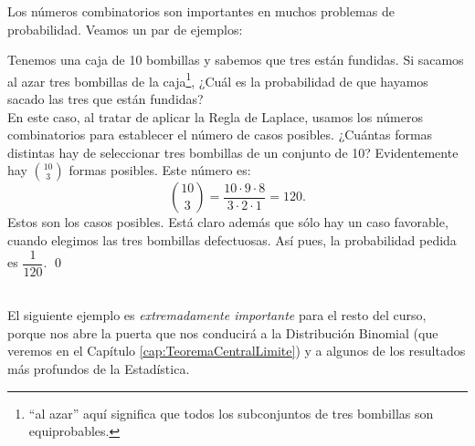 Los números combinatorios son importantes en muchos problemas de probabilidad. Veamos un par de ejemplos:
    \begin{Ejemplo}
    \label{cap03:ejem:BombillasDefectuosas}
    Tenemos una caja de 10 bombillas y sabemos que tres están fundidas. Si sacamos al azar tres bombillas de la caja\footnote{``al azar'' aquí significa que todos los subconjuntos de tres bombillas son equiprobables.}, ¿Cuál es la probabilidad de que hayamos sacado las tres que están fundidas?\\[2mm]
    En este caso, al tratar de aplicar la Regla de Laplace, usamos los números combinatorios para establecer el número de casos posibles. ¿Cuántas formas distintas hay de seleccionar tres bombillas de un conjunto de 10? Evidentemente hay $\binom{10}{3}$ formas posibles. Este número es:
    \[\binom{10}{3}=\dfrac{10\cdot 9\cdot 8}{3\cdot 2\cdot 1}=120.\]
    Estos son los casos posibles. Está claro además que sólo hay un caso favorable, cuando elegimos las tres bombillas defectuosas. Así pues, la probabilidad pedida es $\dfrac{1}{120}$.
    \qed
    \end{Ejemplo}
\quad\\[3mm]    
\noindent El siguiente ejemplo es {\sf\em extremadamente importante} para el resto del curso, porque nos abre la puerta que nos conducirá a la Distribución Binomial (que veremos en el Capítulo \ref{cap:TeoremaCentralLimite}) y a algunos de los resultados más profundos de la Estadística.
